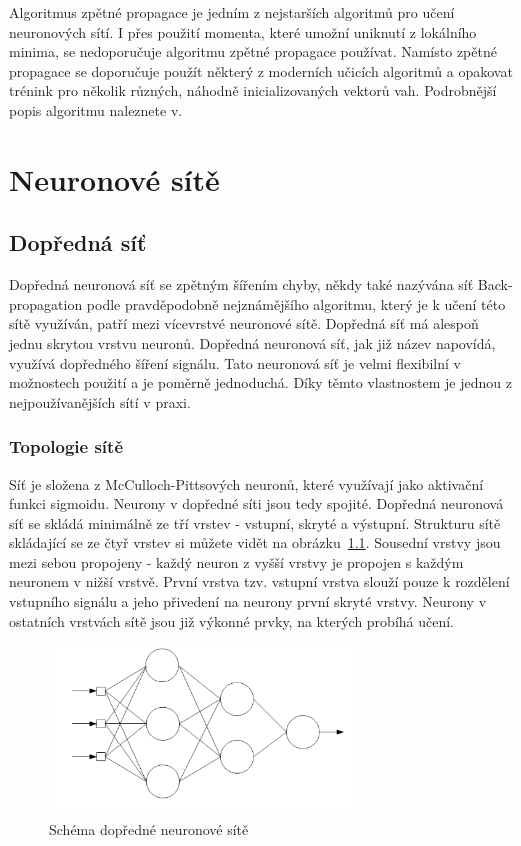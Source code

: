 \documentclass[11pt,twoside,a4paper]{book}
\begin{document}
Algoritmus zpětné propagace je jedním z nejstarších algoritmů pro učení neuronových sítí. I přes použití momenta, které umožní uniknutí z lokálního minima, se nedoporučuje algoritmu zpětné propagace používat. Namísto zpětné propagace se doporučuje použít některý z moderních učicích algoritmů a opakovat trénink pro několik různých, náhodně inicializovaných vektorů vah.\cite{nndocumentation} Podrobnější popis algoritmu naleznete v\citep{skripta}.
\chapter{Neuronové sítě}
\section{Dopředná síť}
Dopředná neuronová síť se zpětným šířením chyby, někdy také nazývána síť Back-propagation podle pravděpodobně nejznámějšího algoritmu, který je k učení této sítě využíván, patří mezi vícevrstvé neuronové sítě. Dopředná síť má alespoň jednu skrytou vrstvu neuronů. Dopředná neuronová síť, jak již název napovídá, využívá dopředného šíření signálu. Tato neuronová síť je velmi flexibilní v možnostech použití a je poměrně jednoduchá. Díky těmto vlastnostem je jednou z nejpoužívanějších sítí v praxi.

\subsection{Topologie sítě}
Síť je složena z McCulloch-Pittsových neuronů, které využívají jako aktivační funkci sigmoidu. Neurony v dopředné síti jsou tedy spojité. Dopředná neuronová síť se skládá minimálně ze tří vrstev - vstupní, skryté a výstupní. Strukturu sítě skládající se ze čtyř vrstev si můžete vidět na obrázku~\ref{fig:ffschema}. Sousední vrstvy jsou mezi sebou propojeny - každý neuron z vyšší vrstvy je propojen s každým neuronem v nižší vrstvě. První vrstva tzv. vstupní vrstva slouží pouze k rozdělení vstupního signálu a jeho přivedení na neurony první skryté vrstvy. Neurony v ostatních vrstvách sítě jsou již výkonné prvky, na kterých probíhá učení.
\begin{figure}[!h]
\begin{center}
\includegraphics[height=4.5cm]{figures/ffschema.png}
\caption{Schéma dopředné neuronové sítě}
\label{fig:ffschema}
\end{center}
\end{figure}
\end{document}
